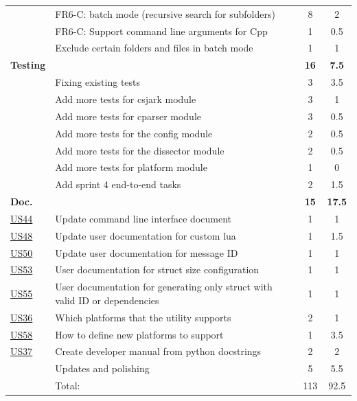 \begin{table}[htbp]
\begin{tabularx}{\textwidth}{l X c c}
	 & FR6-C: \Gls{batch mode} (recursive search for subfolders) &  8  & 2 \\
	 & FR6-C: Support command line arguments for Cpp & 1 & 0.5\\
	 & Exclude certain folders and files in batch mode & 1 & 1 \\
	\addlinespace
	\textbf{Testing} &  & \textbf{16} & \textbf{7.5} \\
	 & Fixing existing tests & 3 & 3.5 \\
	 & Add more tests for csjark module & 3 & 1 \\
	 & Add more tests for cparser module & 3 & 0.5 \\
	 & Add more tests for the config module & 2 & 0.5 \\
	 & Add more tests for the dissector module & 2 & 0.5 \\
	 & Add more tests for platform module & 1 & 0 \\
	 & Add sprint 4 end-to-end tasks & 2 & 1.5 \\
	\addlinespace
	\textbf{Doc.} &  & \textbf{15} & \textbf{17.5} \\
	\hyperref[tab:req:stories10]{US44} & Update command line interface document & 1 & 1 \\
	\hyperref[tab:req:stories11]{US48} & Update user documentation for custom \Gls{lua} & 1 & 1.5 \\
	\hyperref[tab:req:stories12]{US50} & Update user documentation for message ID & 1 & 1 \\
	\hyperref[tab:req:stories12]{US53} & User documentation for \gls{struct} size configuration & 1 & 1 \\
	\hyperref[tab:req:stories12]{US55} & User documentation for generating only \gls{struct} with valid ID or dependencies & 1 & 1 \\
	\hyperref[tab:req:stories9]{US36} & Which platforms that the \gls{utility} supports & 2 & 1 \\
	\hyperref[tab:req:stories13]{US58} & How to define new platforms to support & 1 & 3.5 \\
	\hyperref[tab:req:stories9]{US37} & Create developer manual from python docstrings & 2 & 2 \\
	& Updates and polishing & 5 & 5.5 \\
	\midrule
	& Total: & 113 & 92.5 \\
	\bottomrule
\end{tabularx}
\end{table}

